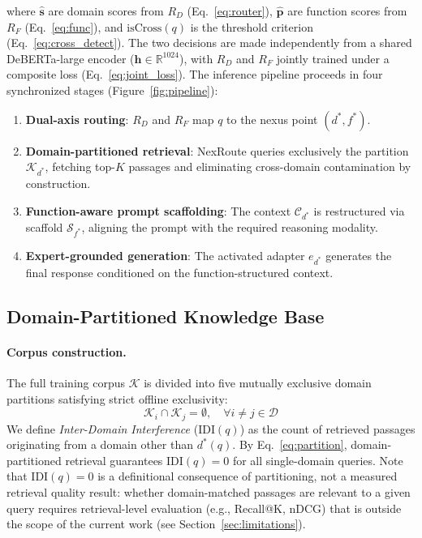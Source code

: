 \documentclass[a4paper,fleql]{cas-sc}
\begin{document}
where $\hat{\mathbf{s}}$ are domain scores from $R_D$ (Eq.~\ref{eq:router}), $\hat{\mathbf{p}}$ are function scores from $R_F$ (Eq.~\ref{eq:func}), and $\mathrm{isCross}(q)$ is the threshold criterion (Eq.~\ref{eq:cross_detect}). The two decisions are made independently from a shared DeBERTa-large encoder ($\mathbf{h} \in \mathbb{R}^{1024}$), with $R_D$ and $R_F$ jointly trained under a composite loss (Eq.~\ref{eq:joint_loss}).
The inference pipeline proceeds in four synchronized stages
(Figure~\ref{fig:pipeline}):
\begin{enumerate}
    \item \textbf{Dual-axis routing}: $R_D$ and $R_F$ map $q$ to the nexus
    point $(d^*, f^*)$.
    \item \textbf{Domain-partitioned retrieval}: NexRoute queries exclusively
    the partition $\mathcal{K}_{d^*}$, fetching top-$K$ passages and
    eliminating cross-domain contamination by construction.
    \item \textbf{Function-aware prompt scaffolding}: The context
    $\mathcal{C}_{d^*}$ is restructured via scaffold $\mathcal{S}_{f^*}$,
    aligning the prompt with the required reasoning modality.
    \item \textbf{Expert-grounded generation}: The activated adapter $e_{d^*}$
    generates the final response conditioned on the function-structured context.
\end{enumerate}
\subsection{Domain-Partitioned Knowledge Base}
\label{ssec:retrieval}
\paragraph{Corpus construction.}
The full training corpus $\mathcal{K}$ is divided into five mutually exclusive
domain partitions satisfying strict offline exclusivity:
\begin{equation}
    \mathcal{K}_i \cap \mathcal{K}_j = \emptyset,
    \quad \forall i \neq j \in \mathcal{D}
    \label{eq:partition}
\end{equation}
We define \emph{Inter-Domain Interference} ($\mathrm{IDI}(q)$) as the
count of retrieved passages originating from a domain other than $d^*(q)$.
By Eq.~\ref{eq:partition}, domain-partitioned retrieval guarantees
$\mathrm{IDI}(q) = 0$ for all single-domain queries.
Note that $\mathrm{IDI}(q){=}0$ is a definitional consequence of partitioning,
not a measured retrieval quality result: whether domain-matched passages are
relevant to a given query requires retrieval-level evaluation (e.g.,
Recall@K, nDCG) that is outside the scope of the current work
(see Section~\ref{sec:limitations}).
\end{document}
